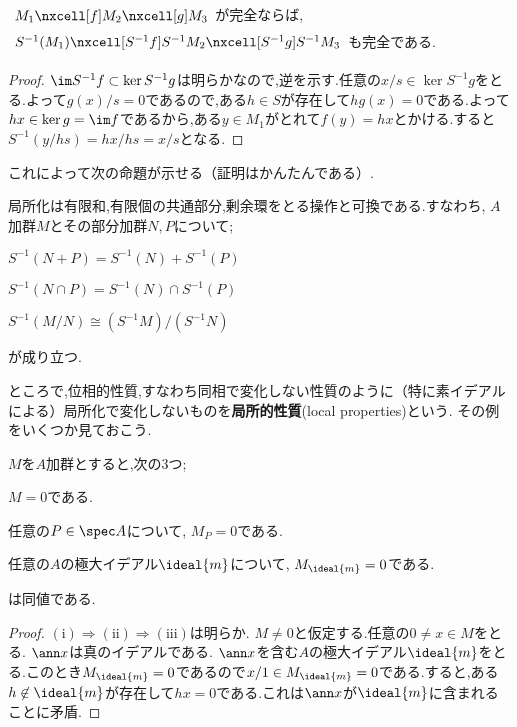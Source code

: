 \begin{prop}\label{prop:局所化は完全関手}
	$\begin{tikzcd}
	M_1\nxcell[f]M_2\nxcell[g]M_3
	\end{tikzcd}$が完全ならば, $\begin{tikzcd}
	S^{-1}(M_1)\nxcell[S^{-1}f]S^{-1}M_2\nxcell[S^{-1}g]S^{-1}M_3
	\end{tikzcd}$も完全である.
\end{prop}
\begin{proof}
	$\im S^{-1}f\subset\ker S^{-1}g$は明らかなので,逆を示す.任意の$x/s\in\ker S^{-1}g$をとる.よって$g(x)/s=0$であるので,ある$h\in S$が存在して$hg(x)=0$である.よって$hx\in\ker g=\im f$であるから,ある$y\in M_1$がとれて$f(y)=hx$とかける.すると$S^{-1}(y/hs)=hx/hs=x/s$となる.
\end{proof}

これによって次の命題が示せる（証明はかんたんである）.
\begin{prop}\label{prop:局所化はいろんな操作と可換}
	局所化は有限和,有限個の共通部分,剰余環をとる操作と可換である.すなわち, $A$加群$M$とその部分加群$N,P$について;
	\begin{sakura}
		\item $S^{-1}(N+P)=S^{-1}(N)+S^{-1}(P)$
		\item $S^{-1}(N\cap P)=S^{-1}(N)\cap S^{-1}(P)$
		\item $S^{-1}(M/N)\cong (S^{-1}M)/(S^{-1}N)$
	\end{sakura}
	が成り立つ.
\end{prop}

ところで,位相的性質,すなわち同相で変化しない性質のように（特に素イデアルによる）局所化で変化しないものを\textbf{局所的性質}(local properties)という. その例をいくつか見ておこう.

\begin{prop}\label{prop:局所化したら0は局所的}
	$M$を$A$加群とすると,次の3つ;
	\begin{sakura}
		\item $M=0$である.
		\item 任意の$P\in \spec A$について, $M_P=0$である.
		\item 任意の$A$の極大イデアル$\ideal{m}$について, $M_{\ideal{m}}=0$である.
	\end{sakura}
	は同値である.
\end{prop}

\begin{proof}
	$(\text{i})\Longrightarrow(\text{ii})\Longrightarrow(\text{iii})$は明らか. $M\neq0$と仮定する.任意の$0\neq x\in M$をとる. $\ann x$は真のイデアルである. $\ann x$を含む$A$の極大イデアル$\ideal{m}$をとる.このとき$M_{\ideal{m}}=0$であるので$x/1\in M_{\ideal{m}}=0$である.すると,ある$h\not\in\ideal{m}$が存在して$hx=0$である.これは$\ann x$が$\ideal{m}$に含まれることに矛盾.
\end{proof}

